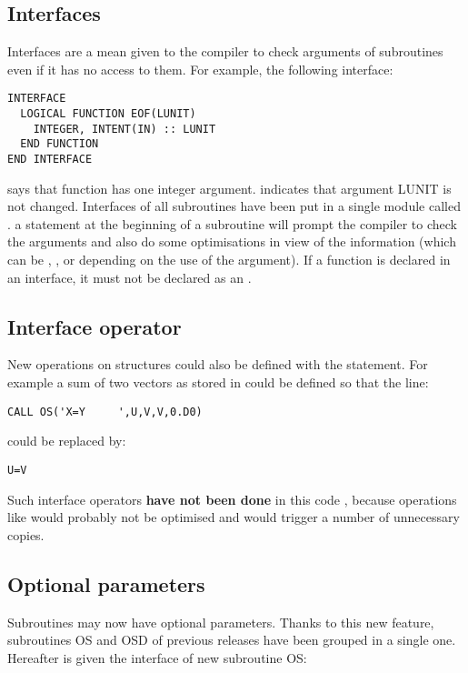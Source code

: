 \subsection{Interfaces}

Interfaces are a mean given to the compiler to check arguments of subroutines
even if it has no access to them. For example, the following interface:

\begin{lstlisting}[language=TelFortran]
INTERFACE
  LOGICAL FUNCTION EOF(LUNIT)
    INTEGER, INTENT(IN) :: LUNIT
  END FUNCTION
END INTERFACE
\end{lstlisting}
says that function  has one integer argument. 
indicates that argument LUNIT is not changed. Interfaces of all \bief
subroutines have been put in a single module called \bief. a 
statement at the beginning of a subroutine will prompt the compiler to check
the arguments and also do some optimisations in view of the 
information (which can be , , or 
depending on the use of the argument). If a function is declared in an
interface, it must not be declared as an .

\subsection{Interface operator}

New operations on structures could also be defined with the  statement. For example a sum of two vectors as stored in \bief could
be defined so that the line:

\begin{lstlisting}[language=TelFortran]
CALL OS('X=Y     ',U,V,V,0.D0)
\end{lstlisting}
could be replaced by:

\begin{lstlisting}[language=TelFortran]
U=V
\end{lstlisting}
Such interface operators \textbf{have not been done} in this code , because
operations like  would probably not be optimised and would
trigger a number of unnecessary copies.

\subsection{Optional parameters}

Subroutines may now have optional parameters. Thanks to this new feature,
subroutines OS and OSD of previous releases have been grouped in a single one.
Hereafter is given the interface of new subroutine OS:

